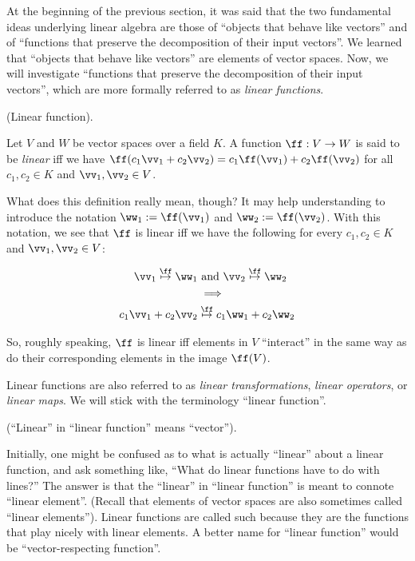 At the beginning of the previous section, it was said that the two fundamental ideas underlying linear algebra are those of ``objects that behave like vectors'' and of ``functions that preserve the decomposition of their input vectors''. We learned that ``objects that behave like vectors'' are elements of vector spaces. Now, we will investigate ``functions that preserve the decomposition of their input vectors'', which are more formally referred to as \textit{linear functions}.

\begin{defn}
\label{ch::lin_alg::defn::linear_function_intuitive}
    (Linear function). 
    
    Let $V$ and $W$ be vector spaces over a field $K$. A function $\ff:V \rightarrow W$ is said to be \textit{linear} iff we have $\ff(c_1 \vv_1 + c_2 \vv_2) = c_1 \ff(\vv_1) + c_2 \ff(\vv_2)$ for all $c_1, c_2 \in K$ and $\vv_1, \vv_2 \in V$.
    
    What does this definition really mean, though? It may help understanding to introduce the notation $\ww_1 := \ff(\vv_1)$ and $\ww_2 := \ff(\vv_2)$. With this notation, we see that $\ff$ is linear iff we have the following for every $c_1, c_2 \in K$ and $\vv_1, \vv_2 \in V$:
    
    \begin{align*}
        \vv_1 \overset{\ff}{\mapsto} \ww_1 &\text{ and } \vv_2 \overset{\ff}{\mapsto} \ww_2 \\
        &\implies \\
        c_1 \vv_1 + c_2 \vv_2 &\overset{\ff}{\mapsto} c_1 \ww_1 + c_2 \ww_2
    \end{align*}
    
    So, roughly speaking, $\ff$ is linear iff elements in $V$ ``interact'' in the same way as do their corresponding elements in the image $\ff(V)$.
    
    Linear functions are also referred to as \textit{linear transformations}, \textit{linear operators}, or \textit{linear maps}. We will stick with the terminology ``linear function''.
\end{defn}

\begin{remark}
    (``Linear'' in ``linear function'' means ``vector'').
    
    Initially, one might be confused as to what is actually ``linear'' about a linear function, and ask something like, ``What do linear functions have to do with lines?'' The answer is that the ``linear'' in ``linear function'' is meant to connote ``linear element''. (Recall that elements of vector spaces are also sometimes called ``linear elements''). Linear functions are called such because they are the functions that play nicely with linear elements. A better name for ``linear function'' would be ``vector-respecting function''.
\end{remark}


